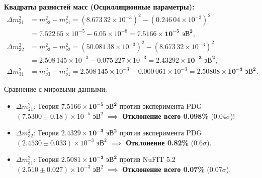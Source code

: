 \documentclass[11pt,a4paper]{article}
\theoremstyle{definition}
\theoremstyle{remark}
\begin{document}
\textbf{Квадраты разностей масс (Осцилляционные параметры):}
\begin{align}
	\Delta m_{21}^2 &= m_{\nu 2}^2 - m_{\nu 1}^2 = (8.673\,32 \times 10^{-3})^2 - (0.246\,04 \times 10^{-3})^2 \nonumber \\
	&= 7.522\,65 \times 10^{-5} - 6.05 \times 10^{-8} = \mathbf{7.5166 \times 10^{-5} \text{ эВ}^2}, \\
	\Delta m_{32}^2 &= m_{\nu 3}^2 - m_{\nu 2}^2 = (50.081\,38 \times 10^{-3})^2 - (8.673\,32 \times 10^{-3})^2 \nonumber \\
	&= 2.508\,145 \times 10^{-3} - 0.075\,227 \times 10^{-3} = \mathbf{2.43292 \times 10^{-3} \text{ эВ}^2}, \\
	\Delta m_{31}^2 &= m_{\nu 3}^2 - m_{\nu 1}^2 = 2.508\,145 \times 10^{-3} - 0.000\,061 \times 10^{-3} = \mathbf{2.50808 \times 10^{-3} \text{ эВ}^2}.
\end{align}

Сравнение с мировыми данными:
\begin{itemize}
	\item $\Delta m_{21}^2$: Теория $\mathbf{7.5166 \times 10^{-5} \text{ эВ}^2}$ против эксперимента PDG $(7.5300 \pm 0.18) \times 10^{-5} \text{ эВ}^2$ $\implies$ \textbf{Отклонение всего 0.098\%} ($0.04\sigma$)!
	\item $\Delta m_{32}^2$: Теория $\mathbf{2.4329 \times 10^{-3} \text{ эВ}^2}$ против эксперимента PDG $(2.4530 \pm 0.033) \times 10^{-3} \text{ эВ}^2$ $\implies$ \textbf{Отклонение 0.82\%} ($0.6\sigma$).
	\item $\Delta m_{31}^2$: Теория $\mathbf{2.5081 \times 10^{-3} \text{ эВ}^2}$ против NuFIT 5.2 $(2.510 \pm 0.027) \times 10^{-3} \text{ эВ}^2$ $\implies$ \textbf{Отклонение всего 0.07\%} ($0.07\sigma$).
\end{itemize}
\end{document}
